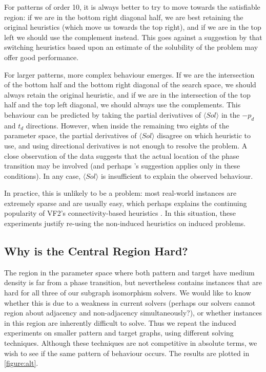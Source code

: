 \documentclass[letterpaper]{article}
\begin{document}
For patterns of order 10, it is always better to try to move towards the satisfiable region: if we
are in the bottom right diagonal half, we are best retaining the original heuristics (which move us
towards the top right), and if we are in the top left we should use the complement instead. This
goes against a suggestion by \citet{Walsh:1998} that switching heuristics based upon an estimate of
the solubility of the problem may offer good performance.

For larger patterns, more complex behaviour emerges. If we are the intersection of the bottom half
and the bottom right diagonal of the search space, we should always retain the original heuristic,
and if we are in the intersection of the top half and the top left diagonal, we should always use
the complements. This behaviour can be predicted by taking the partial derivatives of $\langle Sol
\rangle$ in the $-p_d$ and $t_d$ directions.  However, when inside the remaining two eights of the
parameter space, the partial derivatives of $\langle Sol \rangle$ disagree on which heuristic to
use, and using directional derivatives is not enough to resolve the problem. A close observation of
the data suggests that the actual location of the phase transition may be involved (and perhaps
\citeauthor{Walsh:1998}'s suggestion applies only in these conditions). In any case, $\langle Sol
\rangle$ is insufficient to explain the observed behaviour.

In practice, this is unlikely to be a problem: most real-world instances are extremely sparse and
are usually easy, which perhaps explains the continuing popularity of VF2's connectivity-based
heuristics \citep{Carletti:2015}. In this situation, these experiments justify re-using the
non-induced heuristics on induced problems.

\subsection{Why is the Central Region Hard?}

The region in the parameter space where both pattern and target have medium density is far from a
phase transition, but nevertheless contains instances that are hard for all three of our subgraph
isomorphism solvers. We would like to know whether this is due to a weakness in current solvers
(perhaps our solvers cannot region about adjacency and non-adjacency simultaneously?), or whether
instances in this region are inherently difficult to solve.  Thus we repeat the induced experiments
on smaller pattern and target graphs, using different solving techniques.  Although these techniques
are not competitive in absolute terms, we wish to see if the same pattern of behaviour occurs. The
results are plotted in \cref{figure:alt}.
\end{document}
